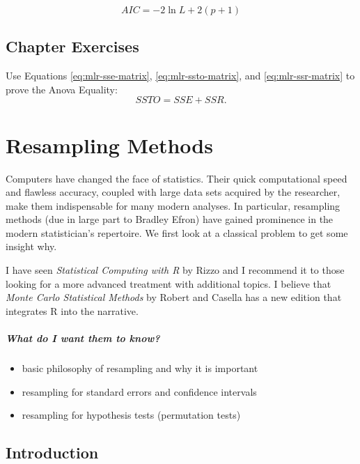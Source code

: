 \documentclass[captions=tableheading]{scrbook}
\begin{document}
\[
AIC=-2\ln L+2(p+1)
\]


\newpage{}
\section{Chapter Exercises}
\label{sec-12-10}


\setcounter{thm}{0}

\begin{xca}
\label{xca:anova-equality}
Use Equations \ref{eq:mlr-sse-matrix}, \ref{eq:mlr-ssto-matrix}, and \ref{eq:mlr-ssr-matrix} to prove the Anova Equality:
\[
SSTO=SSE+SSR.
\]
\end{xca}
\chapter{Resampling Methods}
\label{sec-13}

\label{cha:resampling-methods}


\noindent Computers have changed the face of statistics. Their quick computational speed and flawless accuracy, coupled with large data sets acquired by the researcher, make them indispensable for many modern analyses. In particular, resampling methods (due in large part to Bradley Efron) have gained prominence in the modern statistician's repertoire. We first look at a classical problem to get some insight why. 

I have seen \emph{Statistical Computing with \textsf{R}} by Rizzo \cite{Rizzo2008} and I recommend it to those looking for a more advanced treatment with additional topics. I believe that \emph{Monte Carlo Statistical Methods} by Robert and Casella \cite{Robert2004} has a new edition that integrates \textsf{R} into the narrative.

\paragraph*{What do I want them to know?}

\begin{itemize}
\item basic philosophy of resampling and why it is important
\item resampling for standard errors and confidence intervals
\item resampling for hypothesis tests (permutation tests)
\end{itemize}
\section{Introduction}
\label{sec-13-1}
\end{document}
